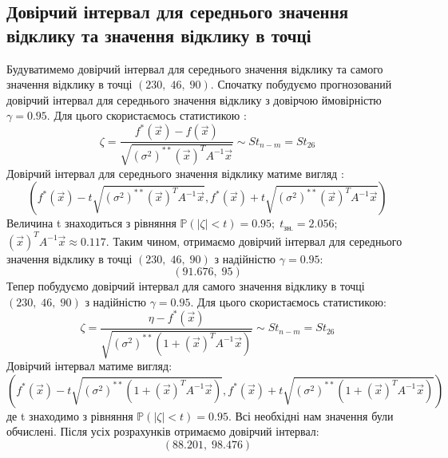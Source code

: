 \documentclass{article}
\begin{document}
    \subsection{Довірчий інтервал для середнього значення відклику та значення відклику в точці}
      Будуватимемо довірчий інтервал для середнього значення відклику та самого 
      значення відклику в точці $ (230, \;46, \;90) $.
      \newline
      Спочатку побудуємо прогнозований довірчий інтервал для середнього значення 
      відклику з довірчою ймовірністю $\gamma = 0.95$. Для цього скористаємось 
      статистикою :
      \begin{equation}
        \zeta = \frac{f^*(\vec{x}) - f(\vec{x})}{\sqrt{(\sigma^2)^{**}(\vec{x})^TA^{-1}\vec{x}}}
        \sim St_{n-m} = St_{26}
      \end{equation}
      Довірчий інтервал для середнього значення відклику матиме вигляд :
      \begin{equation}
        \left( f^*(\vec{x}) - t\sqrt{(\sigma^2)^{**}(\vec{x})^TA^{-1}\vec{x}}, 
        f^*(\vec{x}) + t\sqrt{(\sigma^2)^{**}(\vec{x})^TA^{-1}\vec{x}} \right)
      \end{equation}
      Величина t знаходиться з рівняння $\mathbb{P}(|\zeta| < t) = 0.95; \; t_\text{зн.} = 
      2.056$;\;
      $(\vec{x})^TA^{-1}\vec{x} \approx 0.117$.
      \newline
      Таким чином, отримаємо довірчий інтервал для середнього значення відклику в 
      точці $ (230, \;46, \;90) $ з надійністю $\gamma = 0.95$:
      \begin{equation}
        (91.676,\; 95)
      \end{equation}
      Тепер побудуємо довірчий інтервал для самого значення відклику в точці $ (230, \;46, \;90) $ 
      з надійністю $\gamma = 0.95$. Для цього скористаємось статистикою:
      \begin{equation}
        \zeta = \frac{\eta - f^*(\vec{x})}{\sqrt{(\sigma^2)^{**}(1 + (\vec{x})^TA^{-1}\vec{x})}}      
        \sim St_{n-m} = St_{26}
      \end{equation}
      Довірчий інтервал матиме вигляд:
      \begin{equation}
        \left(f^*(\vec{x}) - t\sqrt{(\sigma^2)^{**}(1 + (\vec{x})^TA^{-1}\vec{x})}, 
        f^*(\vec{x}) + t\sqrt{(\sigma^2)^{**}(1 + (\vec{x})^TA^{-1}\vec{x})}\right)
      \end{equation}
      де t знаходимо з рівняння $\mathbb{P}(|\zeta| < t) = 0.95$.
      Всі необхідні нам значення були обчислені. Після усіх розрахунків отримаємо 
      довірчий інтервал:
      \begin{equation}
        (88.201,\;98.476)
      \end{equation}
      \newpage
\end{document}
